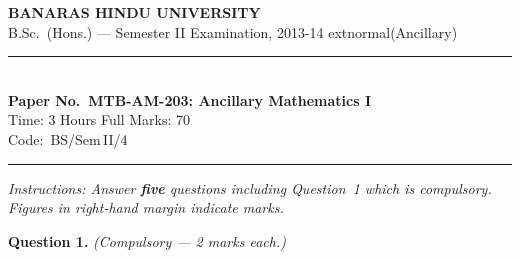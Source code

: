 \documentclass[11pt,a4paper]{article}
\begin{document}
\begin{center}
  {\large\bfseries BANARAS HINDU UNIVERSITY}\\[2pt]
  {\normalsize B.Sc.\ (Hons.) --- Semester II Examination, 2013-14  extnormal{(Ancillary)}}\\[6pt]
  \rule{0.8\linewidth}{0.5pt}\\[6pt]
  {\large\bfseries Paper No.\ MTB-AM-203: Ancillary Mathematics I}\\[4pt]
  {\normalsize Time: 3 Hours \hfill Full Marks: 70}\\[2pt]
  {\small Code:\ BS/Sem\,II/4}
\end{center}
\rule{\linewidth}{0.4pt}
\smallskip



\noindent   \textit{Instructions: Answer   \textbf{five} questions including Question~1 which is compulsory. Figures in right-hand margin indicate marks.}
\bigskip




\noindent   \textbf{Question 1.}   \textit{(Compulsory --- 2 marks each.)}
\end{document}
